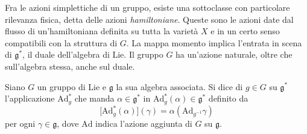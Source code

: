 Fra le azioni simplettiche di un gruppo, esiste una sottoclasse con particolare rilevanza fisica, detta delle azioni \emph{hamiltoniane}. Queste sono le azioni date dal flusso di un'hamiltoniana definita su tutta la varietà $X$ e in un certo senso compatibili con la struttura di $G$. La mappa momento implica l'entrata in scena di $\mathfrak{g}^*$, il duale dell'algebra di Lie. Il gruppo $G$ ha un'azione naturale, oltre che sull'algebra stessa, anche sul duale.
\begin{definition}
  Siano $G$ un gruppo di Lie e $\mathfrak{g}$ la sua algebra associata. Si dice  di $g \in G$ su $\mathfrak{g}^*$ l'applicazione $\mathrm{Ad}_g^*$ che manda $\alpha \in \mathfrak{g}^*$ in $\mathrm{Ad}^*_g(\alpha) \in \mathfrak{g}^*$ definito da
  \begin{equation*}
  \big[\mathrm{Ad}^*_g(\alpha)\big](\gamma) = \alpha(\mathrm{Ad}_{g^{-1}}\gamma)
  \end{equation*}
  per ogni $\gamma \in \mathfrak{g}$, dove $\mathrm{Ad}$ indica l'azione aggiunta di $G$ su $\mathfrak{g}$.
\end{definition}

